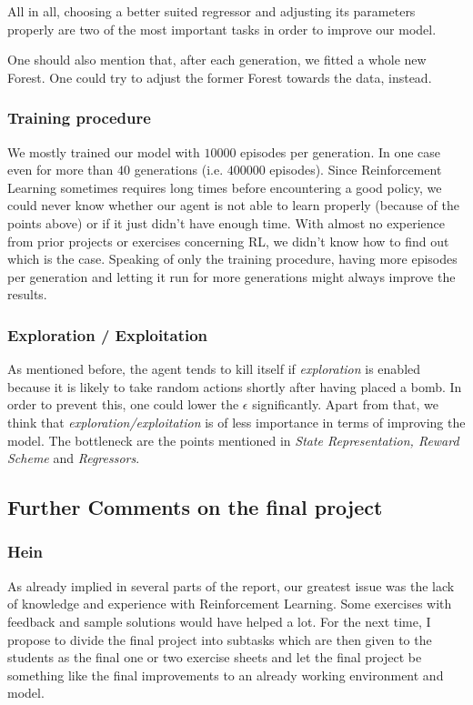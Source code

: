 All in all, choosing a better suited regressor and adjusting its parameters properly are two of the most important tasks in order to improve our model.\par

One should also mention that, after each generation, we fitted a whole new Forest. One could try to adjust the former Forest towards the data, instead.

\subsubsection{Training procedure}
We mostly trained our model with $10000$ episodes per generation. In one case even for more than $40$ generations (i.e. $400000$ episodes). Since Reinforcement Learning sometimes requires long times before encountering a good policy, we could never know whether our agent is not able to learn properly (because of the points above) or if it just didn't have enough time. With almost no experience from prior projects or exercises concerning RL, we didn't know how to find out which is the case. Speaking of only the training procedure, having more episodes per generation and letting it run for more generations might always improve the results.

\subsubsection{Exploration / Exploitation}
As mentioned before, the agent tends to kill itself if \textit{exploration} is enabled because it is likely to take random actions shortly after having placed a bomb. In order to prevent this, one could lower the $\epsilon$ significantly. Apart from that, we think that \textit{exploration/exploitation} is of less importance in terms of improving the model. The bottleneck are the points mentioned in \textit{State Representation, Reward Scheme} and \textit{Regressors}. 

\subsection{Further Comments on the final project}
\subsubsection{Hein}
As already implied in several parts of the report, our greatest issue was the lack of knowledge and experience with Reinforcement Learning. Some exercises with feedback and sample solutions would have helped a lot. For the next time, I propose to divide the final project into subtasks which are then given to the students as the final one or two exercise sheets and let the final project be something like the final improvements to an already working environment and model.
